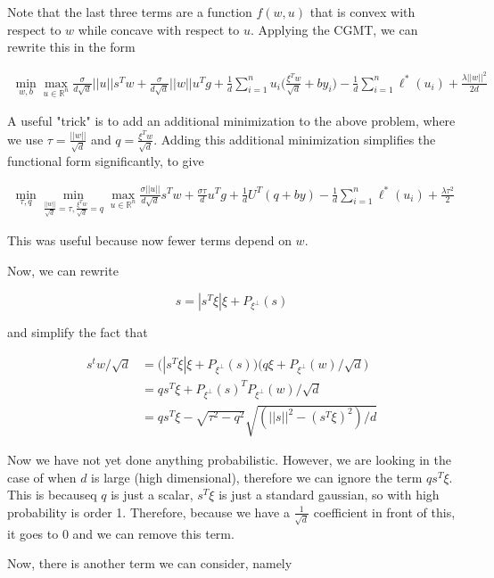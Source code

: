 Note that the last three terms are a function $f(w,u)$ that is convex with respect to $w$ while concave with respect to $u$. Applying the CGMT, we can rewrite this in the form 

\begin{align*}
    \min_{w,b} \max_{u \in \mathbb{R}^n} \frac{\sigma}{d\sqrt{d}} ||u||s^Tw + \frac{\sigma}{d\sqrt{d}} ||w||u^Tg + \frac{1}{d}\sum_{i=1}^n u_i\Big(\frac{\xi^Tw}{\sqrt{d}} + by_i\Big)- \frac{1}{d}\sum_{i=1}^n \ell^*(u_i) + \frac{\lambda||w||^2}{2d}
\end{align*}

A useful "trick" is to add an additional minimization to the above problem, where we use $\tau = \frac{||w||}{\sqrt{d}}$ and $q = \frac{\xi^Tw}{\sqrt{d}}$. Adding this additional minimization simplifies the functional form significantly, to give

\begin{align*}
    \min_{\tau, q} \min_{\frac{||w||}{\sqrt{d}} = \tau, \frac{\xi^Tw}{\sqrt{d}} = q} \max_{u \in \mathbb{R}^n} \frac{\sigma||u||}{d\sqrt{d}} s^Tw + \frac{\sigma\tau}{d} u^Tg + \frac{1}{d}U^T(q + by) - \frac{1}{d}\sum_{i=1}^n \ell^*(u_i) + \frac{\lambda\tau^2}{2}
\end{align*}

This was useful because now fewer terms depend on $w$.

Now, we can rewrite

$$s = |s^T\xi|\xi + P_{\xi^{\perp}}(s)$$

and simplify the fact that 

\begin{align*}
    s^tw/\sqrt{d} &= \big(|s^T\xi|\xi + P_{\xi^{\perp}}(s) \big)\big(q\xi + P_{\xi^{\perp}}(w)/\sqrt{d}\big) \\
    &= qs^T\xi + P_{\xi^{\perp}}(s)^TP_{\xi^{\perp}}(w)/\sqrt{d} \\
    &= qs^T\xi - \sqrt{\tau^2 - q^2}\sqrt{(||s||^2 - (s^T\xi)^2)/d}
\end{align*}

 Now we have not yet done anything probabilistic. However, we are looking in the case of when $d$ is large (high dimensional), therefore we can ignore the term $qs^T\xi$. This is becauseq $q$ is just a scalar, $s^T\xi$ is just a standard gaussian, so with high probability is order 1. Therefore, because we have a $\frac{1}{\sqrt{d}}$ coefficient in front of this, it goes to $0$ and we can remove this term.
 
 Now, there is another term we can consider, namely 
 
